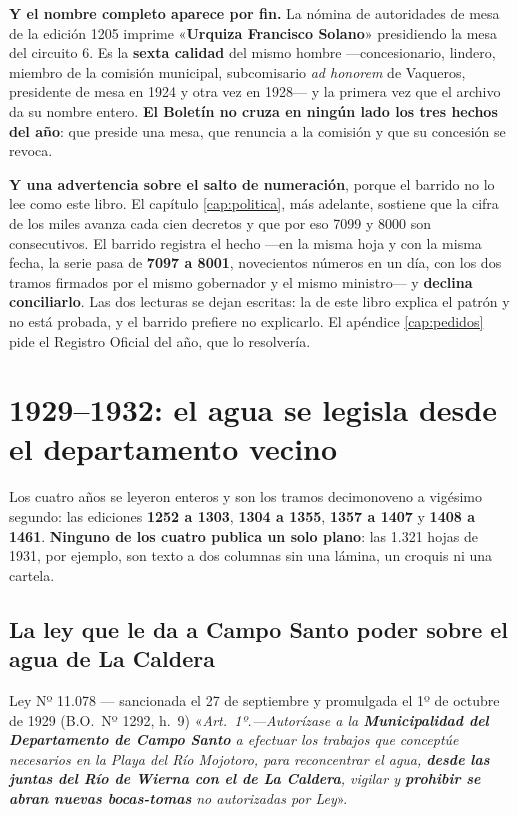 \begin{cautela}
\textbf{Y el nombre completo aparece por fin.} La nómina de autoridades de mesa de la edición
1205 imprime «\textbf{Urquiza Francisco Solano}» presidiendo la mesa del circuito 6. Es la
\textbf{sexta calidad} del mismo hombre ---concesionario, lindero, miembro de la comisión
municipal, subcomisario \textit{ad honorem} de Vaqueros, presidente de mesa en 1924 y otra vez en
1928--- y la primera vez que el archivo da su nombre entero. \textbf{El Boletín no cruza en ningún
lado los tres hechos del año}: que preside una mesa, que renuncia a la comisión y que su
concesión se revoca.

\textbf{Y una advertencia sobre el salto de numeración}, porque el barrido no lo lee como este
libro. El capítulo \ref{cap:politica}, más adelante, sostiene que la cifra de los miles avanza cada cien
decretos y que por eso 7099 y 8000 son consecutivos. El barrido registra el hecho ---en la misma
hoja y con la misma fecha, la serie pasa de \textbf{7097 a 8001}, novecientos números en un día,
con los dos tramos firmados por el mismo gobernador y el mismo ministro--- y \textbf{declina
conciliarlo}. Las dos lecturas se dejan escritas: la de este libro explica el patrón y no está
probada, y el barrido prefiere no explicarlo. El apéndice \ref{cap:pedidos} pide el Registro
Oficial del año, que lo resolvería.
\end{cautela}

\section{1929--1932: el agua se legisla desde el departamento vecino}

Los cuatro años se leyeron enteros y son los tramos decimonoveno a vigésimo segundo: las
ediciones \textbf{1252 a 1303}, \textbf{1304 a 1355}, \textbf{1357 a 1407} y \textbf{1408 a
1461}. \textbf{Ninguno de los cuatro publica un solo plano}: las 1.321 hojas de 1931, por
ejemplo, son texto a dos columnas sin una lámina, un croquis ni una cartela.

\subsection*{La ley que le da a Campo Santo poder sobre el agua de La Caldera}

\begin{ficha}{Ley Nº 11.078 --- sancionada el 27 de septiembre y promulgada el 1º de octubre de 1929 (B.O.\ Nº 1292, h.\ 9)}
«\textit{Art.\ 1º.---Autorízase a la \textbf{Municipalidad del Departamento de Campo Santo} a
efectuar los trabajos que conceptúe necesarios en la Playa del Río Mojotoro, para reconcentrar el
agua, \textbf{desde las juntas del Río de Wierna con el de La Caldera}, vigilar y \textbf{prohibir
se abran nuevas bocas-tomas} no autorizadas por Ley}».
\end{ficha}

